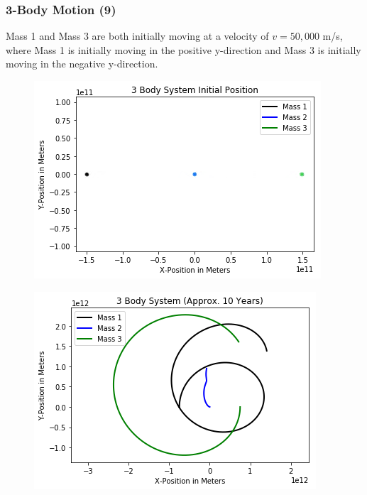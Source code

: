 \documentclass{beamer}
\begin{document}
\begin{frame}
\frametitle{3-Body Motion (9)}
Mass 1 and Mass 3 are both initially moving at a velocity of $v=50,000$ m/s, where Mass 1 is initially moving in the positive y-direction and Mass 3 is initially moving in the negative y-direction.
\begin{multicols}{2}
\begin{figure}
\begin{center}
\includegraphics[width=1.0\linewidth]{3BodyDynamics6.png}
\end{center}
\end{figure}
\begin{figure}
\begin{center}
\includegraphics[width=1.0\linewidth]{3BodyDynamics7.png}
\end{center}
\end{figure}
\end{multicols}
\end{frame}
\end{document}
